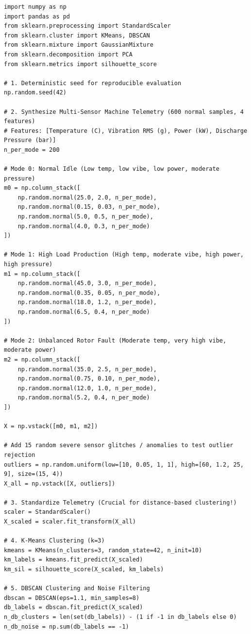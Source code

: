 \begin{lstlisting}[style=pythonstyle]
import numpy as np
import pandas as pd
from sklearn.preprocessing import StandardScaler
from sklearn.cluster import KMeans, DBSCAN
from sklearn.mixture import GaussianMixture
from sklearn.decomposition import PCA
from sklearn.metrics import silhouette_score

# 1. Deterministic seed for reproducible evaluation
np.random.seed(42)

# 2. Synthesize Multi-Sensor Machine Telemetry (600 normal samples, 4 features)
# Features: [Temperature (C), Vibration RMS (g), Power (kW), Discharge Pressure (bar)]
n_per_mode = 200

# Mode 0: Normal Idle (Low temp, low vibe, low power, moderate pressure)
m0 = np.column_stack([
    np.random.normal(25.0, 2.0, n_per_mode),
    np.random.normal(0.15, 0.03, n_per_mode),
    np.random.normal(5.0, 0.5, n_per_mode),
    np.random.normal(4.0, 0.3, n_per_mode)
])

# Mode 1: High Load Production (High temp, moderate vibe, high power, high pressure)
m1 = np.column_stack([
    np.random.normal(45.0, 3.0, n_per_mode),
    np.random.normal(0.35, 0.05, n_per_mode),
    np.random.normal(18.0, 1.2, n_per_mode),
    np.random.normal(6.5, 0.4, n_per_mode)
])

# Mode 2: Unbalanced Rotor Fault (Moderate temp, very high vibe, moderate power)
m2 = np.column_stack([
    np.random.normal(35.0, 2.5, n_per_mode),
    np.random.normal(0.75, 0.10, n_per_mode),
    np.random.normal(12.0, 1.0, n_per_mode),
    np.random.normal(5.2, 0.4, n_per_mode)
])

X = np.vstack([m0, m1, m2])

# Add 15 random severe sensor glitches / anomalies to test outlier rejection
outliers = np.random.uniform(low=[10, 0.05, 1, 1], high=[60, 1.2, 25, 9], size=(15, 4))
X_all = np.vstack([X, outliers])

# 3. Standardize Telemetry (Crucial for distance-based clustering!)
scaler = StandardScaler()
X_scaled = scaler.fit_transform(X_all)

# 4. K-Means Clustering (k=3)
kmeans = KMeans(n_clusters=3, random_state=42, n_init=10)
km_labels = kmeans.fit_predict(X_scaled)
km_sil = silhouette_score(X_scaled, km_labels)

# 5. DBSCAN Clustering and Noise Filtering
dbscan = DBSCAN(eps=1.1, min_samples=8)
db_labels = dbscan.fit_predict(X_scaled)
n_db_clusters = len(set(db_labels)) - (1 if -1 in db_labels else 0)
n_db_noise = np.sum(db_labels == -1)


\end{lstlisting}
